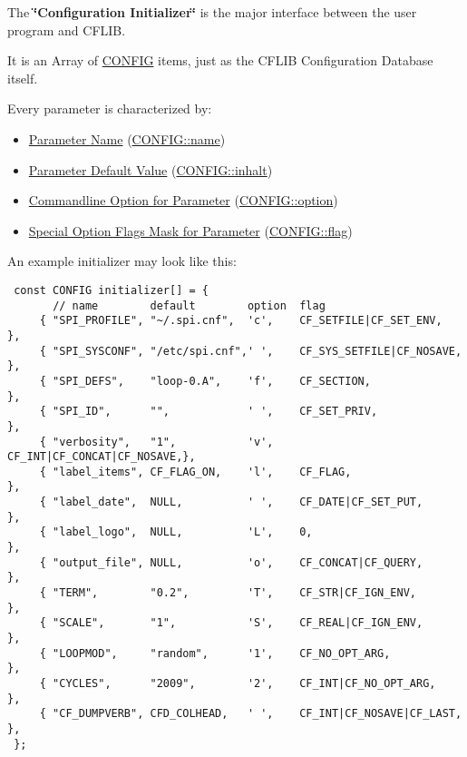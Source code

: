 The {\bf \char`\"{}Configuration Initializer\char`\"{}} is the major interface between the user program and CFLIB.

It is an Array of \hyperlink{struct_c_o_n_f_i_g}{CONFIG} items, just as the CFLIB Configuration Database itself.

Every parameter is characterized by:

\begin{itemize}
\item \hyperlink{config_initializer_parameter_name}{Parameter Name} (\hyperlink{struct_c_o_n_f_i_g_196d63e311e3d1aa79fe4f16f20ce2a5}{CONFIG::name})\end{itemize}


\begin{itemize}
\item \hyperlink{config_initializer_parameter_default}{Parameter Default Value} (\hyperlink{struct_c_o_n_f_i_g_b8cae13203b07fabaa40e407fa8dbdfb}{CONFIG::inhalt})\end{itemize}


\begin{itemize}
\item \hyperlink{config_initializer_parameter_option}{Commandline Option for Parameter} (\hyperlink{struct_c_o_n_f_i_g_60563bd93e85c1ddb8291a2d27a9c472}{CONFIG::option})\end{itemize}


\begin{itemize}
\item \hyperlink{config_initializer_parameter_flagmask}{Special Option Flags Mask for Parameter} (\hyperlink{struct_c_o_n_f_i_g_b04d08abdf758c0400caaded716f4089}{CONFIG::flag})\end{itemize}


An example initializer may look like this: 

\begin{Code}\begin{verbatim} const CONFIG initializer[] = {
       // name        default        option  flag
     { "SPI_PROFILE", "~/.spi.cnf",  'c',    CF_SETFILE|CF_SET_ENV,     },
     { "SPI_SYSCONF", "/etc/spi.cnf",' ',    CF_SYS_SETFILE|CF_NOSAVE,  },
     { "SPI_DEFS",    "loop-0.A",    'f',    CF_SECTION,                },
     { "SPI_ID",      "",            ' ',    CF_SET_PRIV,               },
     { "verbosity",   "1",           'v',    CF_INT|CF_CONCAT|CF_NOSAVE,},
     { "label_items", CF_FLAG_ON,    'l',    CF_FLAG,                   },
     { "label_date",  NULL,          ' ',    CF_DATE|CF_SET_PUT,        },
     { "label_logo",  NULL,          'L',    0,                         },
     { "output_file", NULL,          'o',    CF_CONCAT|CF_QUERY,        },
     { "TERM",        "0.2",         'T',    CF_STR|CF_IGN_ENV,         },
     { "SCALE",       "1",           'S',    CF_REAL|CF_IGN_ENV,        },
     { "LOOPMOD",     "random",      '1',    CF_NO_OPT_ARG,             },
     { "CYCLES",      "2009",        '2',    CF_INT|CF_NO_OPT_ARG,      },
     { "CF_DUMPVERB", CFD_COLHEAD,   ' ',    CF_INT|CF_NOSAVE|CF_LAST,  },
 };
\end{verbatim}
\end{Code}



